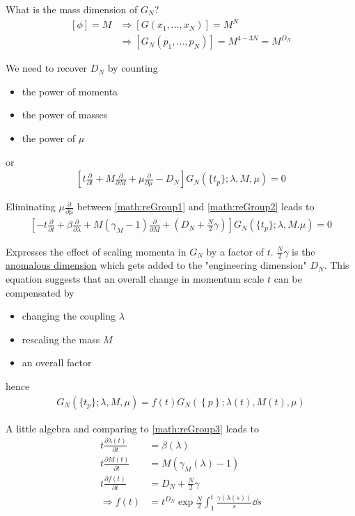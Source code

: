 What is the mass dimension of $G_N$? 
\begin{align*}
   \left[ \phi \right] = M &\Rightarrow \left[G(x_1, \dots, x_N)\right] = M^N \\
   &\Rightarrow \left[ G_N(p_1, \dots, p_N) \right] = M^{4-3N} = M^{D_N}
\end{align*}

We need to recover $D_N$ by counting
\begin{itemize}
   \item the power of momenta
   \item the power of masses
   \item the power of $\mu$
\end{itemize}
or
\begin{align}
   \left[ t \frac{\partial}{\partial t} + M \frac{\partial}{\partial M} + \mu \frac{\partial}{\partial \mu} - D_N \right]G_N \left(\{t_p\};\lambda,M,\mu \right) = 0
   \label{math:reGroup2}
\end{align}

Eliminating $\mu \frac{\partial}{\partial \mu}$ between \ref{math:reGroup1} and \ref{math:reGroup2} leads to
\begin{align}
   \left[ -t\frac{\partial}{\partial t} + \beta \frac{\partial}{\partial \lambda} + M(\gamma_M - 1)\frac{\partial}{\partial M} + (D_N + \frac{N}{2}\gamma) \right] G_N \left(\{t_p\}; \lambda, M. \mu \right) = 0 \label{math:reGroup3}
\end{align}

Expresses the effect of scaling momenta in $G_N$ by a factor of $t$. $\frac{N}{2}\gamma$ is the \underline{anomalous dimension} which gets added to the "engineering dimension" $D_N$. This equation suggests that an overall change in momentum scale $t$ can be compensated by
\begin{itemize}
   \item changing the coupling $\lambda$
   \item rescaling the mass $M$
   \item an overall factor
\end{itemize}
hence
\begin{align*}
   G_N \left( \{ t_p \}; \lambda, M, \mu \right) = f(t) G_N \left( \left\{ p \right\}; \lambda(t), M(t), \mu \right)
\end{align*}

A little algebra and comparing to \ref{math:reGroup3} leads to 
\begin{align*}
   t \frac{\partial \lambda(t)}{\partial t} &= \beta(\lambda) \\
   t \frac{\partial M(t)}{\partial t} &= M(\gamma_M (\lambda) - 1) \\
   t \frac{\partial f(t)}{\partial t} &= D_N + \frac{N}{2} \gamma \\
   \Rightarrow f(t) &= t^{D_N} \exp{  \frac{N}{2} \int^t_1 \frac{\gamma(\lambda(s))}{s} \dd s  }
\end{align*}

